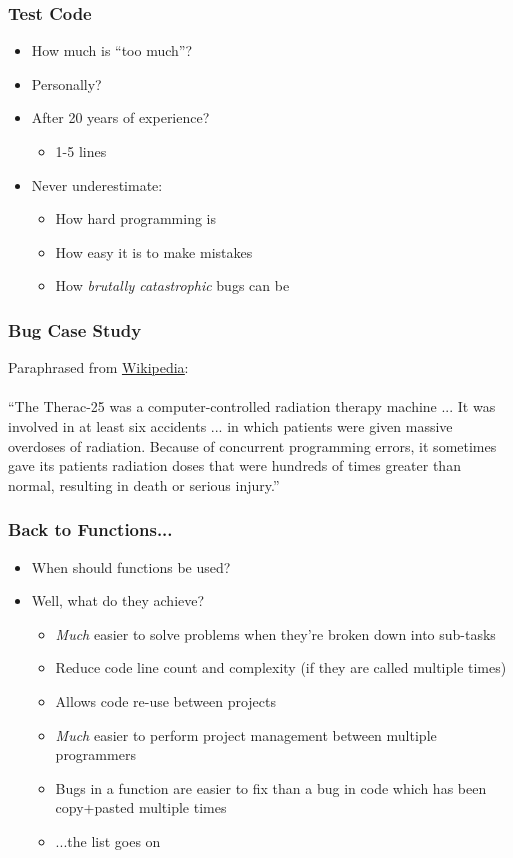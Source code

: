 \documentclass[14pt]{beamer}
\begin{document}
\begin{frame}
\frametitle{Test Code}
\begin{itemize}
\item How much is ``too much''?
\pause
\item Personally?
\pause
\item After 20 years of experience?
\pause
	\begin{itemize}
		\item 1-5 lines
	\end{itemize}
\pause
\item Never underestimate:
	\begin{itemize}
		\item How hard programming is
		\item How easy it is to make mistakes
		\item How \textit{brutally catastrophic} bugs can be
	\end{itemize}
\end{itemize}
\end{frame}

\begin{frame}
\frametitle{Bug Case Study}
Paraphrased from \underline{\href{https://en.wikipedia.org/wiki/Therac-25}{Wikipedia}}:
\\~\\
``The Therac-25 was a computer-controlled radiation therapy machine ... It was involved in at least six accidents ...  in which patients were given massive overdoses of radiation. Because of concurrent programming errors, it sometimes gave its patients radiation doses that were hundreds of times greater than normal, resulting in death or serious injury.''
\end{frame}

\begin{frame}
\frametitle{Back to Functions...}
\begin{itemize}
\item When should functions be used?
\pause
\item Well, what do they achieve?
	\begin{itemize}
		\item \textit{Much} easier to solve problems when they're broken down into sub-tasks
		\item Reduce code line count and complexity (if they are called multiple times)
		\item Allows code re-use between projects
		\item \textit{Much} easier to perform project management between multiple programmers
		\item Bugs in a function are easier to fix than a bug in code which has been copy+pasted multiple times
		\item ...the list goes on
	\end{itemize}
\end{itemize}
\end{frame}
\end{document}
